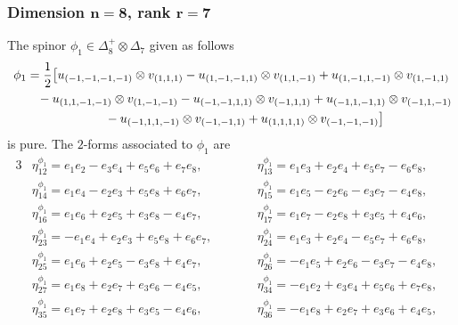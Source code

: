 \documentclass[10pt,a4paper]{amsart}
\numberwithin{equation}{section}
\begin{document}
\subsubsection[Dimension $n=8$, rank $r=7$]{Dimension $\boldsymbol{n=8}$, rank $\boldsymbol{r=7}$} \label{subsec: Spin(7)}

{\allowdisplaybreaks The spinor $\phi_1\in\Delta_8^+\otimes\Delta_7$ given as follows
\begin{gather}
{\phi_1} = {1\over 2}\big[u_{(-1,-1,-1,-1)}\otimes v_{(1,1,1)} -u_{(1,-1,-1,1)}\otimes v_{(1,1,-1)}+u_{(1,-1,1,-1)}\otimes v_{(1,-1,1)} \nonumber\\
 \hphantom{{\phi_1} =}{} -u_{(1,1,-1,-1)}\otimes v_{(1,-1,-1)} -u_{(-1,-1,1,1)}\otimes v_{(-1,1,1)} +u_{(-1,1,-1,1)}\otimes v_{(-1,1,-1)} \nonumber\\
 \hphantom{{\phi_1} =}{}-u_{(-1,1,1,-1)}\otimes v_{(-1,-1,1)} +u_{(1,1,1,1)}\otimes v_{(-1,-1,-1)} \big]\label{eq: rank 7 pure spinor}
\end{gather}
is pure. The $2$-forms associated to $\phi_1$ are
\begin{alignat*}{3}
& \eta^{\phi_1}_{1 2} = e_{1} e_{2} - e_{3} e_{4} + e_{5} e_{6} + e_{7} e_{8},\qquad &&
 \eta^{\phi_1}_{1 3} = e_{1} e_{3} + e_{2} e_{4} + e_{5} e_{7} - e_{6} e_{8},&\\
& \eta^{\phi_1}_{1 4} = e_{1} e_{4} - e_{2} e_{3} + e_{5} e_{8} + e_{6} e_{7},\qquad &&
 \eta^{\phi_1}_{1 5} = e_{1} e_{5} - e_{2} e_{6} - e_{3} e_{7} - e_{4} e_{8},&\\
& \eta^{\phi_1}_{1 6} = e_{1} e_{6} + e_{2} e_{5} + e_{3} e_{8} - e_{4} e_{7},\qquad &&
 \eta^{\phi_1}_{1 7} = e_{1} e_{7} - e_{2} e_{8} + e_{3} e_{5} + e_{4} e_{6},&\\
& \eta^{\phi_1}_{2 3} = -e_{1} e_{4} + e_{2} e_{3} + e_{5} e_{8} + e_{6} e_{7},\qquad &&
 \eta^{\phi_1}_{2 4} = e_{1} e_{3} + e_{2} e_{4} - e_{5} e_{7} + e_{6} e_{8},&\\
& \eta^{\phi_1}_{2 5} = e_{1} e_{6} + e_{2} e_{5} - e_{3} e_{8} + e_{4} e_{7},\qquad &&
 \eta^{\phi_1}_{2 6} = -e_{1} e_{5} + e_{2} e_{6} - e_{3} e_{7} - e_{4} e_{8},&\\
& \eta^{\phi_1}_{2 7} = e_{1} e_{8} + e_{2} e_{7} + e_{3} e_{6} - e_{4} e_{5},\qquad &&
 \eta^{\phi_1}_{3 4} = -e_{1} e_{2} + e_{3} e_{4} + e_{5} e_{6} + e_{7} e_{8},&\\
& \eta^{\phi_1}_{3 5} = e_{1} e_{7} + e_{2} e_{8} + e_{3} e_{5} - e_{4} e_{6},\qquad &&
 \eta^{\phi_1}_{3 6} = -e_{1} e_{8} + e_{2} e_{7} + e_{3} e_{6} + e_{4} e_{5},&\\

\end{alignat*}}
\end{document}
